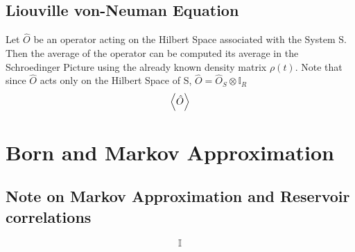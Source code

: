 \documentclass{scrartcl}
\begin{document}
\subsection{Liouville von-Neuman Equation}
Let $\hat{O}$ be an operator acting on the Hilbert Space associated with the System S. Then the average of the operator can be computed its average in the Schroedinger Picture using the already known density matrix $\rho(t)$. Note that since $\hat{O}$ acts only on the Hilbert Space of S, $\hat{O} = \hat{O}_S \otimes \mathbb{I}_R$
\begin{align}
    \expval{\hat{O}} 
\end{align}
\section{Born and Markov Approximation}
\subsection{Note on Markov Approximation and Reservoir correlations}
\[
\mathbb I
\]
\end{document}
